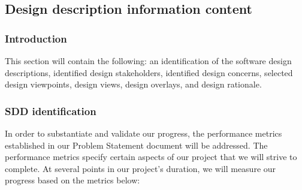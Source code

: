\documentclass[onecolumn, draftclsnofoot,10pt, compsoc]{IEEEtran}
\begin{document}
\subsection{Design description information content}
\subsubsection{Introduction}
This section will contain the following: an identification of the software design descriptions, identified design stakeholders, identified design concerns, selected design viewpoints, design views, design overlays, and design rationale.

\subsubsection{SDD identification}
In order to substantiate and validate our progress, the performance metrics established in our Problem Statement document will be addressed. The performance metrics specify certain aspects of our project that we will strive to complete. At several points in our project's duration, we will measure our progress based on the metrics below:
\end{document}
